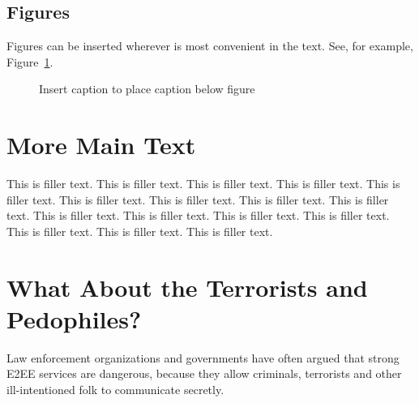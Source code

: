 \documentclass{sig-alternate-hotpets}
\begin{document}


\subsection{Figures}
Figures can be inserted wherever is most convenient in the text. See, for example,
Figure~\ref{fig1}.
\begin{figure}[h]
\centering
\caption{Insert caption to place caption below figure}
\label{fig1}
\end{figure}


\section{More Main Text}
This is filler text. This is filler text. This is filler text. This is filler text. This is filler text. This is filler text. This is filler text. This is filler text. This is filler text. This is filler text. This is filler text. This is filler text. This is filler text. This is filler text. This is filler text. This is filler text.

\section{What About the Terrorists and Pedophiles?}

Law enforcement organizations and governments have often argued that strong E2EE services are dangerous, because they allow criminals, terrorists and other ill-intentioned folk to communicate secretly.

\balancecolumns


%

\balancecolumns
\end{document}

